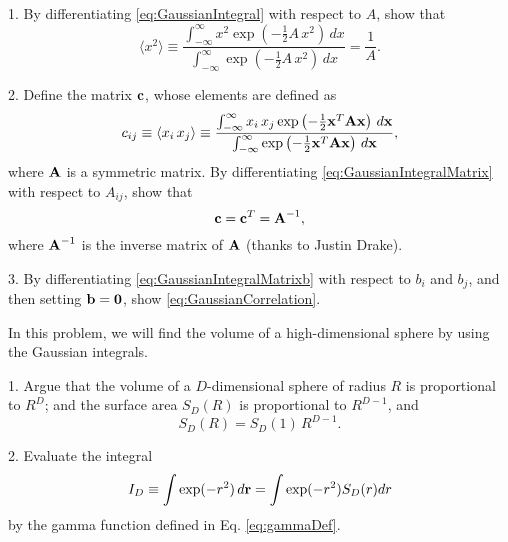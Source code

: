 \documentclass{book}
\begin{document}



1. By differentiating \eqref{eq:GaussianIntegral} with respect to $A$, show that
\begin{equation}
  \langle x^2 \rangle
\equiv \frac {
  \int_{-\infty}^{\infty}
    x^2 \exp\left( - \frac{1}{2} A\,x^2 \right) \, dx
} {
  \int_{-\infty}^{\infty}
  \exp\left( - \frac{1}{2} A\,x^2 \right) \, dx
}
=
\frac{1}{A}.
\end{equation}

2.
Define the matrix $\boldsymbol{\mathbf{c}}$, whose elements are defined as
\begin{equation*}
c_{ij}
\equiv \langle x_i \, x_j \rangle
\equiv \frac {
  \int_{-\infty}^{\infty}
    x_i \, x_j \exp\left( -\frac{1}{2} \boldsymbol{\mathbf{x}}^T \boldsymbol{\mathbf{A}} \boldsymbol{\mathbf{x}} \right) \, d\boldsymbol{\mathbf{x}}
} {
\int_{-\infty}^{\infty}
  \exp\left( -\frac{1}{2} \boldsymbol{\mathbf{x}}^T \boldsymbol{\mathbf{A}} \boldsymbol{\mathbf{x}} \right) \, d\boldsymbol{\mathbf{x}}
},
\end{equation*}
%
where $\boldsymbol{\mathbf{A}}$ is a symmetric matrix.
%
By differentiating \eqref{eq:GaussianIntegralMatrix} with respect to $A_{ij}$, show that
%
\begin{equation}
  \boldsymbol{\mathbf{c}} = \boldsymbol{\mathbf{c}}^T = \boldsymbol{\mathbf{A}}^{-1},
  \label{eq:GaussianCorrelation}
\end{equation}
%
where
$\boldsymbol{\mathbf{A}}^{-1}$ is the inverse matrix of $\boldsymbol{\mathbf{A}}$
(thanks to Justin Drake).


3. By differentiating \eqref{eq:GaussianIntegralMatrixb} with respect to $b_i$ and $b_j$,
and then setting $\boldsymbol{\mathbf{b}} = \boldsymbol{\mathbf{0}}$, show \eqref{eq:GaussianCorrelation}.








In this problem, we will find the volume of a high-dimensional sphere
by using the Gaussian integrals.

1. Argue that the volume of a $D$-dimensional sphere of radius $R$ is proportional to
$R^D$; and the surface area $S_D(R)$ is proportional to $R^{D-1}$, and
\[
  S_D(R) = S_D(1) \, R^{D-1}.
\]

2. Evaluate the integral
\[
  I_D \equiv \int \exp(-r^2) \, d\boldsymbol{\mathbf{r}} = \int \exp(-r^2) S_D(r) dr
\]
by the gamma function defined in Eq. \eqref{eq:gammaDef}.
\end{document}
